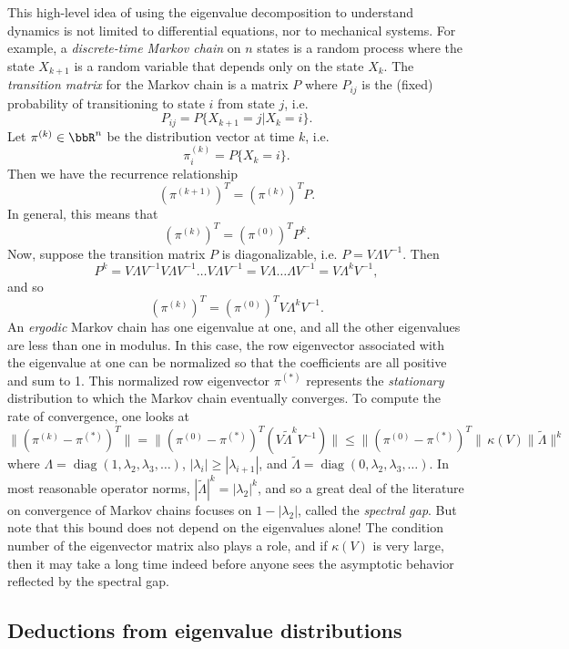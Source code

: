 This high-level idea of using the eigenvalue decomposition to
understand dynamics is not limited to differential equations, nor to
mechanical systems.  For example, a {\em discrete-time Markov chain}
on $n$ states is a random process where the state $X_{k+1}$ is a
random variable that depends only on the state $X_k$.  The {\em
  transition matrix} for the Markov chain is a matrix $P$ where
$P_{ij}$ is the (fixed) probability of transitioning to state $i$ from
state $j$, i.e.
\[
  P_{ij} = P\{X_{k+1} = j | X_{k} = i\}.
\]
Let $\pi^{(k)} \in \bbR^n$ be the distribution vector at time $k$,
i.e.
\[
  \pi^{(k)}_i = P\{X_k = i\}.
\]
Then we have the recurrence relationship
\[
  (\pi^{(k+1)})^T = (\pi^{(k)})^T P.
\]
In general, this means that
\[
  (\pi^{(k)})^T = (\pi^{(0)})^T P^k.
\]
Now, suppose the transition matrix $P$ is diagonalizable, i.e. $P = V
\Lambda V^{-1}$.  Then
\[
  P^k = V \Lambda V^{-1} V \Lambda V^{-1} \ldots V \Lambda V^{-1}
      = V \Lambda \ldots \Lambda V^{-1} = V \Lambda^k V^{-1},
\]
and so
\[
  (\pi^{(k)})^T = (\pi^{(0)})^T V \Lambda^k V^{-1}.
\]
An {\em ergodic} Markov chain has one eigenvalue at one, and all the
other eigenvalues are less than one in modulus.  In this case, the row
eigenvector associated with the eigenvalue at one can be normalized so
that the coefficients are all positive and sum to 1.  This normalized
row eigenvector $\pi^{(*)}$ represents the {\em stationary}
distribution to which the Markov chain eventually converges.  To
compute the rate of convergence, one looks at
\[
  \|(\pi^{(k)}-\pi^{(*)})^T\| =
  \|(\pi^{(0)}-\pi^{(*)})^T (V \tilde{\Lambda}^k V^{-1})\| \leq
  \|(\pi^{(0)}-\pi^{(*)})^T \| \, \kappa(V) \|\tilde{\Lambda}\|^k
\]
where $\Lambda = \operatorname{diag}(1, \lambda_2, \lambda_3,
\ldots)$, $|\lambda_i| \geq |\lambda_{i+1}|$, and $\tilde{\Lambda} =
\operatorname{diag}(0, \lambda_2, \lambda_3, \ldots)$.  In most
reasonable operator norms, $|\tilde{\Lambda}|^k = |\lambda_2|^k$,
and so a great deal of the literature on convergence of Markov chains
focuses on $1-|\lambda_2|$, called the {\em spectral gap}.
But note that this bound does not depend on the eigenvalues alone!
The condition number of the eigenvector matrix also plays a role, and
if $\kappa(V)$ is very large, then it may take a long time indeed
before anyone sees the asymptotic behavior reflected by the spectral gap.

\subsection{Deductions from eigenvalue distributions}

